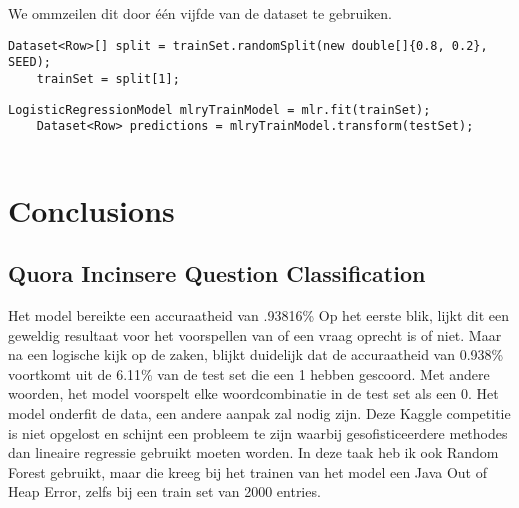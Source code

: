 We ommzeilen dit door één vijfde van de dataset te gebruiken.
\begin{lstlisting}[style=codeStyle]
    Dataset<Row>[] split = trainSet.randomSplit(new double[]{0.8, 0.2}, SEED); 
    trainSet = split[1];
\end{lstlisting}

\begin{lstlisting}[style=codeStyle]
	LogisticRegressionModel mlryTrainModel = mlr.fit(trainSet);
    Dataset<Row> predictions = mlryTrainModel.transform(testSet);
    
\end{lstlisting}


\section{Conclusions}
\label{sec:conclusions}
\subsection{Quora Incinsere Question Classification}
Het model bereikte een accuraatheid van .93816\%
Op het eerste blik, lijkt dit een geweldig resultaat voor het voorspellen van of een vraag oprecht is of niet.
Maar na een logische kijk op de zaken, blijkt duidelijk dat de accuraatheid van 0.938\% voortkomt uit de 6.11\% van de test set die een 1 hebben gescoord. Met andere woorden, het model voorspelt elke woordcombinatie in de test set als een 0. Het model onderfit de data, een andere aanpak zal nodig zijn. Deze Kaggle competitie is niet opgelost en schijnt een probleem te zijn waarbij gesofisticeerdere methodes dan lineaire regressie gebruikt moeten worden. In deze taak heb ik ook Random Forest gebruikt, maar die kreeg bij het trainen van het model een Java Out of Heap Error, zelfs bij een train set van 2000 entries. 

  

